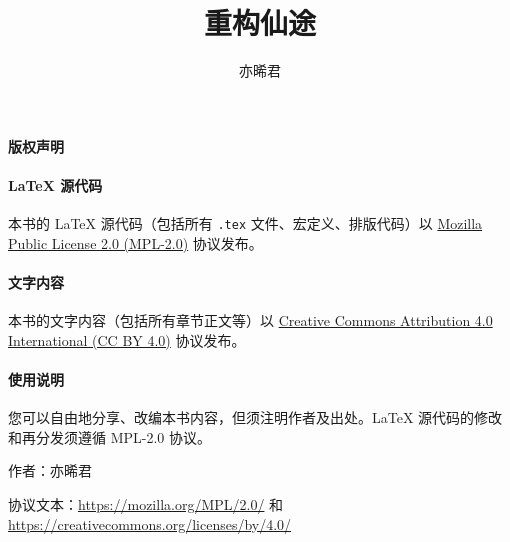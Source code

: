 \documentclass[UTF8,openany,fontset=none,a4paper,oneside]{ctexbook}
\title{\Huge\textbf{重构仙途}}
\author{亦晞君}
\date{}
\begin{document}
\maketitle

\thispagestyle{empty}  %
\vspace*{\fill}
\begin{center}
    \textbf{\Large 版权声明}

    \vspace{1em}

    \paragraph{LaTeX 源代码}

    本书的 LaTeX 源代码（包括所有 \texttt{.tex} 文件、宏定义、排版代码）以 \href{https://mozilla.org/MPL/2.0/}{Mozilla Public License 2.0 (MPL-2.0)} 协议发布。

    \vspace{1.5em}

    \paragraph{文字内容} 本书的文字内容（包括所有章节正文等）以 \href{https://creativecommons.org/licenses/by/4.0/}{Creative Commons Attribution 4.0 International (CC BY 4.0)} 协议发布。

    \vspace{1.5em}

    \paragraph{使用说明} 您可以自由地分享、改编本书内容，但须注明作者及出处。LaTeX 源代码的修改和再分发须遵循 MPL-2.0 协议。

    \vspace{2em}

    作者：亦晞君

    协议文本：\url{https://mozilla.org/MPL/2.0/} 和 \url{https://creativecommons.org/licenses/by/4.0/}
\end{center}
\vspace*{\fill}
\newpage

\frontmatter


\mainmatter
\tableofcontents






\end{document}
